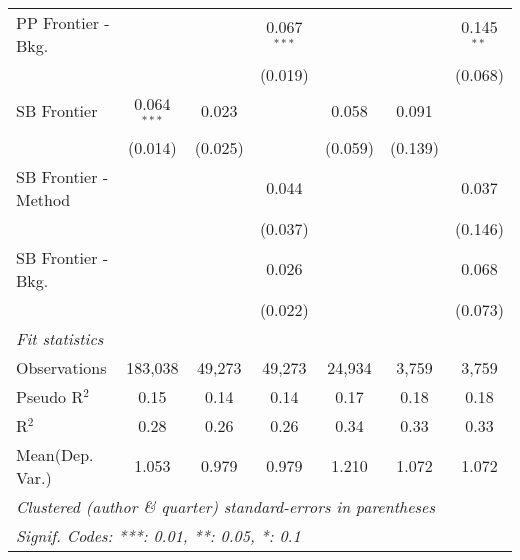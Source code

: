 \begin{tabular}{lcccccc}
   PP Frontier - Bkg.   &               &               & 0.067$^{***}$ &               &         & 0.145$^{**}$\\   
                        &               &               & (0.019)       &               &         & (0.068)\\   
   SB Frontier          & 0.064$^{***}$ & 0.023         &               & 0.058         & 0.091   &   \\   
                        & (0.014)       & (0.025)       &               & (0.059)       & (0.139) &   \\   
   SB Frontier - Method &               &               & 0.044         &               &         & 0.037\\   
                        &               &               & (0.037)       &               &         & (0.146)\\   
   SB Frontier - Bkg.   &               &               & 0.026         &               &         & 0.068\\   
                        &               &               & (0.022)       &               &         & (0.073)\\   
   \midrule
   \emph{Fit statistics}\\
   Observations         & 183,038       & 49,273        & 49,273        & 24,934        & 3,759   & 3,759\\  
   Pseudo R$^2$         & 0.15          & 0.14          & 0.14          & 0.17          & 0.18    & 0.18\\  
   R$^2$                & 0.28          & 0.26          & 0.26          & 0.34          & 0.33    & 0.33\\  
Mean(Dep. Var.) & 1.053 & 0.979 & 0.979 & 1.210 & 1.072 & 1.072 \\
   \midrule \midrule
   \multicolumn{7}{l}{\emph{Clustered (author \& quarter) standard-errors in parentheses}}\\
   \multicolumn{7}{l}{\emph{Signif. Codes: ***: 0.01, **: 0.05, *: 0.1}}\\
\end{tabular}
\par\endgroup
